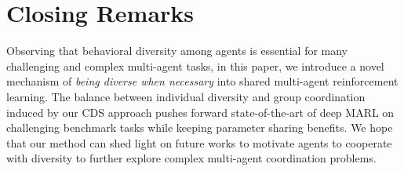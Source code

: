 \section{Closing Remarks}\label{sec:closing}

Observing that behavioral diversity among agents is essential for many challenging and complex multi-agent tasks, in this paper, we introduce a novel mechanism of \emph{being diverse when necessary} into shared multi-agent reinforcement learning. The balance between individual diversity and group coordination induced by our CDS approach pushes forward state-of-the-art of deep MARL on challenging benchmark tasks while keeping parameter sharing benefits. We hope that our method can shed light on future works to motivate agents to cooperate with diversity to further explore complex multi-agent coordination problems.